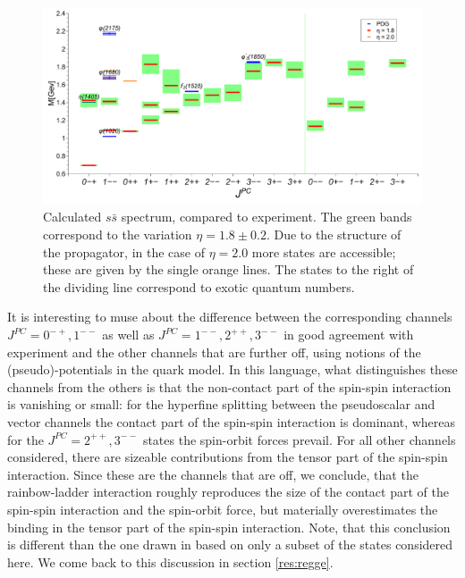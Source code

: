 \begin{figure}[h]
\begin{center}
\includegraphics[width=0.999\textwidth]{figures/spectrum_ss}
\caption{ \footnotesize Calculated $s\bar{s}$ spectrum, compared to experiment. The green bands correspond to the 
variation $\eta=1.8\pm0.2$. Due to the structure of the propagator, in the case of $\eta=2.0$ more states are accessible; 
these are given by the single orange lines. The states to the right of the dividing line correspond to exotic quantum 
numbers.}\label{fig:spectrumss}
\end{center}
\end{figure}
It is interesting to muse about the difference between the corresponding channels $J^{PC}=0^{-+},1^{--}$
as well as $J^{PC}=1^{--},2^{++},3^{--}$ in good agreement with experiment and the other channels that 
are further off, using notions of the (pseudo)-potentials in the quark model. In this language, what distinguishes these 
channels from the others is that the non-contact part of the spin-spin interaction 
is vanishing or small: for the hyperfine splitting between the pseudoscalar and vector 
channels the contact part of the spin-spin interaction is dominant, whereas for the $J^{PC}=2^{++},3^{--}$
states the spin-orbit forces prevail. For all other channels considered, there are sizeable 
contributions from the tensor part of the spin-spin interaction. Since these are the channels
that are off, we conclude, that the rainbow-ladder interaction roughly reproduces the size of
the contact part of the spin-spin interaction and the spin-orbit force, but materially overestimates
the binding in the tensor part of the spin-spin interaction. Note, that this conclusion is 
different than the one drawn in \cite{Qin:2011xq} based on only a subset of the states considered here.  
We come back to this discussion in section \ref{res:regge}.
